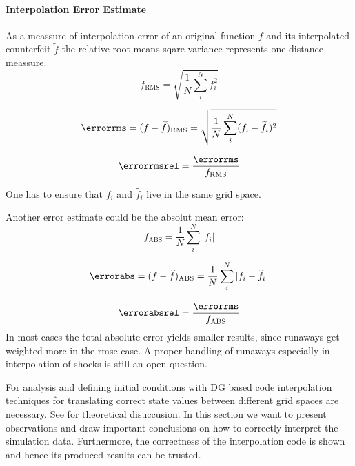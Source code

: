 \paragraph{Interpolation Error Estimate}

As a meassure of interpolation error of an original function $f$ and its
interpolated counterfeit $\widetilde{f}$ the relative root-means-sqare variance
represents one distance meassure.
\begin{equation}
    f_{\text{RMS}} = \sqrt{\frac{1}{N} \sum^N_i f^2_i} 
\end{equation}

\begin{equation}
    \errorrms = (f - \widetilde{f})_{\text{RMS}} = \sqrt{\frac{1}{N} \sum^N_i (f_i - \widetilde{f_i})^2} 
\end{equation}

\begin{equation}
    \errorrmsrel = \frac{\errorrms}{f_{\text{RMS}}} 
\end{equation}

One has to ensure that $f_i$ and $\widetilde{f_i}$ live in the same grid space.

Another error estimate could be the absolut mean error:
\begin{equation}
    f_{\text{ABS}} = \frac{1}{N}\sum^N_i |f_i| 
\end{equation}

\begin{equation}
    \errorabs = (f - \widetilde{f})_{\text{ABS}} = \frac{1}{N}\sum^N_i |f_i - \widetilde{f_i}| 
\end{equation}

\begin{equation}
    \errorabsrel = \frac{\errorrms}{f_{\text{ABS}}} 
\end{equation}
In most cases the total absolute error yields smaller results, since runaways
get weighted more in the rmse case. A proper handling of runaways especially in
interpolation of shocks is still an open question.

For analysis and defining initial conditions with DG based code interpolation
techniques for translating correct state values between different grid spaces
are necessary. See  for theoretical disuccusion.
In this section we want to present observations and draw important conclusions
on how to correctly interpret the simulation data. Furthermore, the correctness
of the interpolation code is shown and hence its produced results can be trusted.

